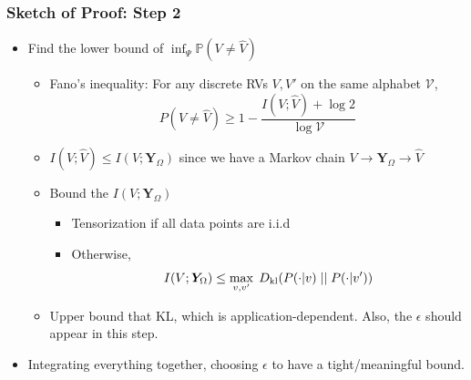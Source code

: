 \documentclass[10pt,xcolor={usenames,dvipsnames,table},aspectratio=169]{beamer}
\begin{document}
\begin{frame}
\frametitle{Sketch of Proof:  Step 2}   
\begin{itemize}
    \item Find the lower bound of $\inf_{\Psi} \mathbb{P}(V \neq \widehat{V})$
        \begin{itemize}
            \item Fano's inequality: For any discrete RVs $V, V'$ on the same alphabet $\mathcal{V}$,
        \[
        P(V \neq \widehat{V}) \geq 1-\dfrac{I(V; \widehat{V}) + \log 2}{\log{\mathcal{V}}}
        \] 
    \item $I(V; \widehat{V}) \leq I(V; \bm{Y}_{\Omega})$ since we have a Markov chain $V \rightarrow \bm{Y}_{\Omega} \rightarrow \widehat{V}$
    \item Bound the $I(V; \bm{Y}_{\Omega})$  \citep{scarlett2019introductory}
        \begin{itemize}
            \item Tensorization if all data points are i.i.d
            \item Otherwise,
                \[
                I(V; \bm{Y}_{\Omega}) \leq \max_{v, v'} \; D_{\rm kl} (P(\cdot|v) \; || \; P(\cdot| v'))
                \] 
        \end{itemize}
        \item Upper bound that KL, which is application-dependent. Also, the $\epsilon$ should appear in this step.

        \end{itemize}
        \item Integrating everything together, choosing $\epsilon$ to have a tight/meaningful bound.
\end{itemize}
\end{frame}
\end{document}
